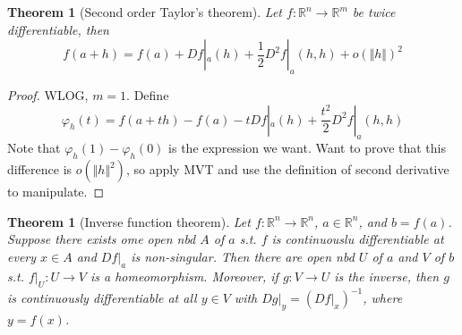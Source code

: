 \documentclass{article}
\theoremstyle{definition}
\theoremstyle{remark}
\theoremstyle{plain}
\newtheorem{thm}[defn]{Theorem}
\theoremstyle{definition}
\newcommand{\RR}{\mathbb{R}}
\begin{document}
\begin{thm}[Second order Taylor's theorem]
    Let $f:\RR^n\to\RR^m$ be twice differentiable, then
    \[f(a+h)=f(a)+Df|_a(h)+\dfrac{1}{2}D^2f|_a(h,h)+o(\Vert h\Vert)^2\]
\end{thm}
\begin{proof}
    WLOG, $m=1$. Define
    \[\varphi_h(t)=f(a+th)-f(a)-tDf|_a(h)+\dfrac{t^2}{2}D^2f|_a(h,h)\]
    Note that $\varphi_h(1)-\varphi_h(0)$ is the expression we want.
    Want to prove that this difference is $o(\Vert h\Vert^2)$, so apply MVT and use the definition of second derivative to manipulate.
\end{proof}
\begin{thm}[Inverse function theorem]
    Let $f:\RR^n\to\RR^n$, $a\in\RR^n$, and $b=f(a)$. Suppose there exists ome open nbd $A$ of $a$ s.t. $f$ is continuouslu differentiable at every $x\in A$ and $Df|_a$ is non-singular. Then there are open nbd $U$ of $a$ and $V$ of $b$ s.t. $f|_U:U\to V$ is a homeomorphism. Moreover, if $g:V\to U$ is the inverse, then $g$ is continuously differentiable at all $y\in V$ with $Dg|_y=(Df|_x)^{-1}$, where $y=f(x)$.
\end{thm}
\end{document}
